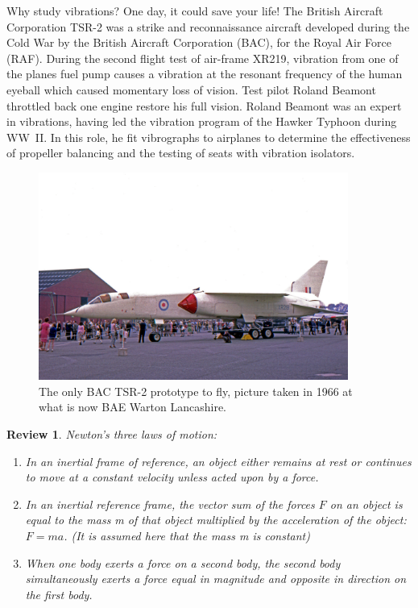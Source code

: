 \documentclass[12pt,letter]{article}
\numberwithin{ex}{section} %
\newtheorem{re}{Review}
\numberwithin{re}{section} %
\newenvironment{review}{\begin{mdframed}[middlelinewidth=2mm,roundcorner=20pt]\begin{re}\normalfont}{\end{re}\end{mdframed}}
\newtheorem{vcs}{Vibration Case Study}
\numberwithin{vcs}{section} %
\newenvironment{vibration_case_study}{\begin{mdframed}[linecolor=orange,middlelinewidth=2mm,roundcorner=20pt]\begin{vcs}\normalfont}{\end{vcs}\end{mdframed}}
\begin{document}
	\begin{vibration_case_study}
		Why study vibrations? One day, it could save your life! The British Aircraft Corporation TSR-2 was a strike and reconnaissance aircraft developed during the Cold War by the British Aircraft Corporation (BAC), for the Royal Air Force (RAF). During the second flight test of air-frame XR219, vibration from one of the planes fuel pump causes a vibration at the resonant frequency of the human eyeball which caused momentary loss of vision. Test pilot Roland Beamont throttled back one engine restore his full vision. Roland Beamont was an expert in vibrations, having led the vibration program of the Hawker Typhoon during WW~II. In this role, he fit vibrographs to airplanes to determine the effectiveness of propeller balancing and the testing of seats with vibration isolators. 

		\begin{figure}[H]
			\centering
			\includegraphics[width=4in]{../figures/TSR_2.jpg}
			\caption{The only BAC TSR-2 prototype to fly, picture taken in 1966 at what is now BAE Warton Lancashire.\protect\footnotemark[1]}
		\end{figure}
	\end{vibration_case_study}

	\begin{review}
		Newton's three laws of motion:
		\begin{enumerate}
			\item In an inertial frame of reference, an object either remains at rest or continues to move at a constant velocity unless acted upon by a force.
			\item In an inertial reference frame, the vector sum of the forces $F$ on an object is equal to the mass m of that object multiplied by the acceleration of the object: $F = ma$. (It is assumed here that the mass m is constant)
			\item When one body exerts a force on a second body, the second body simultaneously exerts a force equal in magnitude and opposite in direction on the first body.
		\end{enumerate}
	\end{review}
\end{document}
